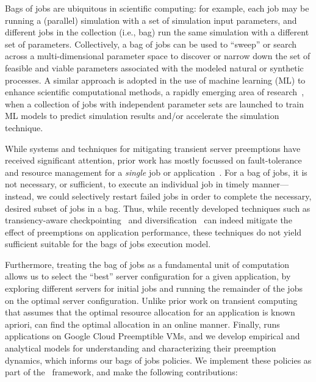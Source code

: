 
Bags of jobs are ubiquitous in scientific computing: for example, each job may be running a (parallel) simulation with a set of simulation input parameters, and different jobs in the collection (i.e., bag) run the same simulation with a different set of  parameters. 
Collectively, a bag of jobs can be used to ``sweep'' or search across a multi-dimensional parameter space to discover or narrow down the set of feasible and viable parameters associated with the modeled natural or synthetic processes.
A similar approach is adopted in the use of machine learning (ML) to enhance scientific computational methods, a rapidly emerging area of research~\cite{}, when a collection of jobs with independent parameter sets are launched to train ML models to predict simulation results and/or accelerate the simulation technique. 



While systems and techniques for mitigating transient server preemptions have received significant attention, prior work has mostly focussed on fault-tolerance and resource management for a \emph{single} job or application~\cite{spoton, exosphere, flint, marathe2014exploiting}. 
For a bag of jobs, it is not necessary, or sufficient, to execute an individual job in timely manner---instead, we could selectively restart failed jobs in order to complete the necessary, desired subset of jobs in a bag.
Thus, while recently developed techniques such as transiency-aware checkpointing~\cite{marathe2014exploiting, flint}
and diversification~\cite{exosphere, spotweb} can indeed mitigate the effect of preemptions on application performance, these techniques do not yield sufficient  suitable for the bags of jobs execution model. 


%
Furthermore, treating the bag of jobs as a fundamental unit of computation allows us to select the ``best'' server configuration for a given application, by exploring different servers for initial jobs and running the remainder of the jobs on the optimal server configuration. 
Unlike prior work on transient computing that assumes that the optimal resource allocation for an application is known apriori, \sysname can find the optimal allocation in an online manner. 
Finally, \sysname runs applications on Google Cloud Preemptible VMs, and we develop empirical and analytical models for understanding and characterizing their preemption dynamics, which informs our bags of jobs policies. 
We implement these policies as part of the \sysname~framework, and make the following contributions:

